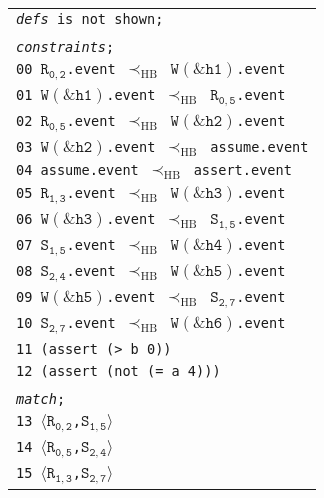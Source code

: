 \newsavebox{\boxSMTb}
\begin{lrbox}{\boxSMTb}
\normalsize
\begin{tabular}[c]{l}
\texttt{\textit{defs} is not shown;}\\
\\
\texttt{\textit{constraints};}\\
\texttt{00 $\mathtt{R_{0,2}}$.event $\mathrm{\prec_{HB}}$ $\mathtt{W(\&h1)}$.event}\\
\texttt{01 $\mathtt{W(\&h1)}$.event $\mathrm{\prec_{HB}}$ $\mathtt{R_{0,5}}$.event}\\
\texttt{02 $\mathtt{R_{0,5}}$.event $\mathrm{\prec_{HB}}$ $\mathtt{W(\&h2)}$.event}\\
\texttt{03 $\mathtt{W(\&h2)}$.event $\mathrm{\prec_{HB}}$ assume.event}\\
\texttt{04 assume.event $\mathrm{\prec_{HB}}$ assert.event}\\
\texttt{05 $\mathtt{R_{1,3}}$.event $\mathrm{\prec_{HB}}$ $\mathtt{W(\&h3)}$.event}\\
\texttt{06 $\mathtt{W(\&h3)}$.event $\mathrm{\prec_{HB}}$ $\mathtt{S_{1,5}}$.event}\\
\texttt{07 $\mathtt{S_{1,5}}$.event $\mathrm{\prec_{HB}}$ $\mathtt{W(\&h4)}$.event}\\
\texttt{08 $\mathtt{S_{2,4}}$.event $\mathrm{\prec_{HB}}$ $\mathtt{W(\&h5)}$.event}\\
\texttt{09 $\mathtt{W(\&h5)}$.event $\mathrm{\prec_{HB}}$ $\mathtt{S_{2,7}}$.event}\\
\texttt{10 $\mathtt{S_{2,7}}$.event $\mathrm{\prec_{HB}}$ $\mathtt{W(\&h6)}$.event}\\
\texttt{11 (assert (> b 0))}\\
\texttt{12 (assert (not (= a 4)))}\\
\\
\texttt{\textit{match};}\\
\texttt{13 $\langle\mathtt{R_{0,2}}$,$\mathtt{S_{1,5}}\rangle$}\\
\texttt{14 $\langle\mathtt{R_{0,5}}$,$\mathtt{S_{2,4}}\rangle$}\\
\texttt{15 $\langle\mathtt{R_{1,3}}$,$\mathtt{S_{2,7}}\rangle$}\\

\end{tabular}
\end{lrbox}

